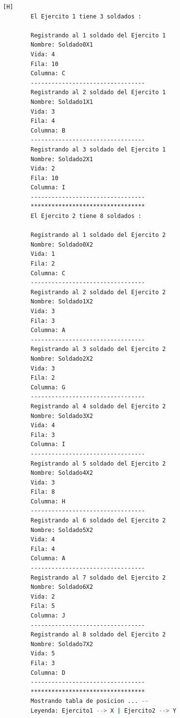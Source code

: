\documentclass{article}
\begin{document}
	\begin{lstlisting}[language=bash,caption={La ejecución: \textcolor{red}{PARA PODER VER LA TABLA COMPLETAMENTE MIRAR LA PLANTILLA DE LATEX O EJECUTARLO: }}][H]
		El Ejercito 1 tiene 3 soldados : 

		Registrando al 1 soldado del Ejercito 1
		Nombre: Soldado0X1
		Vida: 4
		Fila: 10
		Columna: C
		---------------------------------
		Registrando al 2 soldado del Ejercito 1
		Nombre: Soldado1X1
		Vida: 3
		Fila: 4
		Columna: B
		---------------------------------
		Registrando al 3 soldado del Ejercito 1
		Nombre: Soldado2X1
		Vida: 2
		Fila: 10
		Columna: I
		---------------------------------
		*********************************
		El Ejercito 2 tiene 8 soldados : 
		
		Registrando al 1 soldado del Ejercito 2
		Nombre: Soldado0X2
		Vida: 1
		Fila: 2
		Columna: C
		---------------------------------
		Registrando al 2 soldado del Ejercito 2
		Nombre: Soldado1X2
		Vida: 3
		Fila: 3
		Columna: A
		---------------------------------
		Registrando al 3 soldado del Ejercito 2
		Nombre: Soldado2X2
		Vida: 3
		Fila: 2
		Columna: G
		---------------------------------
		Registrando al 4 soldado del Ejercito 2
		Nombre: Soldado3X2
		Vida: 4
		Fila: 3
		Columna: I
		---------------------------------
		Registrando al 5 soldado del Ejercito 2
		Nombre: Soldado4X2
		Vida: 3
		Fila: 8
		Columna: H
		---------------------------------
		Registrando al 6 soldado del Ejercito 2
		Nombre: Soldado5X2
		Vida: 4
		Fila: 4
		Columna: A
		---------------------------------
		Registrando al 7 soldado del Ejercito 2
		Nombre: Soldado6X2
		Vida: 2
		Fila: 5
		Columna: J
		---------------------------------
		Registrando al 8 soldado del Ejercito 2
		Nombre: Soldado7X2
		Vida: 5
		Fila: 3
		Columna: D
		---------------------------------
		*********************************
		Mostrando tabla de posicion ... --
		Leyenda: Ejercito1 --> X | Ejercito2 --> Y
		

\end{lstlisting}
\end{document}
